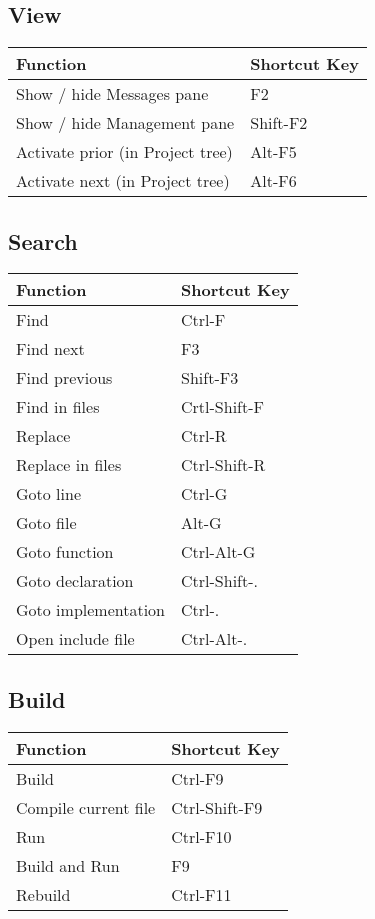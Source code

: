 \subsection{View}

\begin{tabular}{|l|l|}\hline
Function 		&	Shortcut Key\\ \hline
Show / hide Messages pane	&	F2\\ \hline
Show / hide Management pane 	&	Shift-F2\\ \hline
Activate prior (in Project tree) & 	Alt-F5\\ \hline
Activate next (in Project tree)  &	Alt-F6\\ \hline
\end{tabular}

\subsection{Search}

\begin{tabular}{|l|l|}\hline
Function 	&	Shortcut Key\\ \hline
Find 		&	Ctrl-F\\ \hline
Find next 	&	F3\\ \hline
Find previous 	&	Shift-F3\\ \hline
Find in files 	&	Crtl-Shift-F\\ \hline
Replace 	&	Ctrl-R\\ \hline
Replace in files &	Ctrl-Shift-R\\ \hline
Goto line 	&	Ctrl-G\\ \hline
Goto file 	&	Alt-G\\ \hline
Goto function 	&	Ctrl-Alt-G\\ \hline
Goto declaration & Ctrl-Shift-.\\ \hline
Goto implementation & Ctrl-.\\ \hline
Open include file & Ctrl-Alt-.\\ \hline
\end{tabular}

\subsection{Build}

\begin{tabular}{|l|l|}\hline
Function 	&	Shortcut Key\\ \hline
Build 		&	Ctrl-F9\\ \hline
Compile current file	&	Ctrl-Shift-F9\\ \hline
Run		&	Ctrl-F10\\ \hline
Build and Run 	&	F9\\ \hline
Rebuild 	&	Ctrl-F11\\ \hline
\end{tabular}






